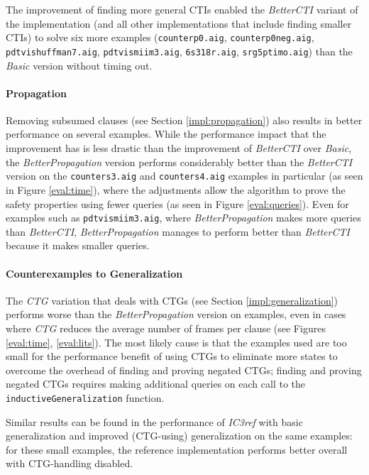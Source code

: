 \documentclass[12pt,a4paper,twoside,openright]{report}
\begin{document}
{{{The improvement of finding more general CTIs enabled the \emph{BetterCTI} variant of the implementation
(and all other implementations that include finding smaller CTIs) to
solve six more examples (\verb,counterp0.aig,, \verb,counterp0neg.aig,, \verb,pdtvishuffman7.aig,, 
\verb,pdtvismiim3.aig,, \verb,6s318r.aig,, \verb,srg5ptimo.aig,) than the \emph{Basic} version without
timing out.}

\paragraph{Propagation}{
Removing subsumed clauses (see Section \ref{impl:propagation}) also results in better performance on several
examples. While the performance impact that the improvement has is less drastic than the improvement of
\emph{BetterCTI} over \emph{Basic}, the \emph{BetterPropagation} version performs
considerably better
than the \emph{BetterCTI} version on the \verb,counters3.aig, and \verb,counters4.aig, examples in
particular (as seen in Figure \ref{eval:time}), where the adjustments allow the algorithm to prove the safety properties using fewer
queries (as seen in Figure \ref{eval:queries}). Even for examples such as \verb,pdtvismiim3.aig,, where \emph{BetterPropagation} makes more
queries than \emph{BetterCTI}, \emph{BetterPropagation} manages to perform better than \emph{BetterCTI}
because it makes smaller queries.}

\paragraph{Counterexamples to Generalization}{
The \emph{CTG} variation that deals with CTGs (see Section \ref{impl:generalization})
performs worse than the \emph{BetterPropagation} version
on examples, even in cases where \emph{CTG} reduces the average number of frames per clause (see Figures \ref{eval:time}, \ref{eval:lits}).
The most likely cause is that the examples used are too small for the performance benefit of
using CTGs to eliminate more states
to overcome the overhead of finding and proving negated CTGs;
finding and proving negated CTGs requires
making additional queries on each call to the \verb,inductiveGeneralization, function.

Similar results can be found
in the performance of \emph{IC3ref} with basic generalization and
improved (CTG-using) generalization on the same examples: for these small examples,
the reference implementation performs better overall with CTG-handling disabled.}

}}
\end{document}

